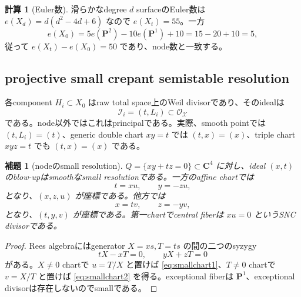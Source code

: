 \documentclass[11pt,a4paper]{ltjsarticle}
\newtheorem{lemma}[theorem]{補題}
\theoremstyle{definition}
\newtheorem{computation}[theorem]{計算}
\theoremstyle{remark}
\newcommand{\PP}{\mathbf P}
\newcommand{\CC}{\mathbf C}
\begin{document}
\begin{computation}[Euler数]
滑らかなdegree $d$ surfaceのEuler数は $e(X_d)=d(d^2-4d+6)$ なので $e(X_t)=55$。一方
\[
 e(X_0)=5e(\PP^2)-10e(\PP^1)+10=15-20+10=5,
\]
従って $e(X_t)-e(X_0)=50$ であり、node数と一致する。
\end{computation}

\subsection{projective small crepant semistable resolution}

各component $H_i\subset X_0$ はraw total space上のWeil divisorであり、そのidealは
\begin{equation}\label{eq:componentideal}
 \mathcal I_i=(t,L_i)\subset\mathcal O_{\mathcal X}
\end{equation}
である。node以外ではこれはprincipalである。実際、smooth pointでは $(t,L_i)=(t)$、generic double chart $xy=t$ では $(t,x)=(x)$、triple chart $xyz=t$ でも $(t,x)=(x)$ である。

\begin{lemma}[nodeのsmall resolution]\label{lem:local-small-resolution}
$Q=\{xy+tz=0\}\subset\CC^4$ に対し、ideal $(x,t)$ のblow-upはsmoothなsmall resolutionである。一方のaffine chartでは
\begin{equation}\label{eq:smallchart1}
 t=xu,\qquad y=-zu,
\end{equation}
となり、$(x,z,u)$ が座標である。他方では
\begin{equation}\label{eq:smallchart2}
 x=tv,\qquad z=-yv,
\end{equation}
となり、$(t,y,v)$ が座標である。第一chartでcentral fiberは $xu=0$ というSNC divisorである。
\end{lemma}

\begin{proof}
Rees algebraにはgenerator $X=xs,T=ts$ の間の二つのsyzygy
\[
 tX-xT=0,\qquad yX+zT=0
\]
がある。$X\ne0$ chartで $u=T/X$ と置けば \eqref{eq:smallchart1}、$T\ne0$ chartで $v=X/T$ と置けば \eqref{eq:smallchart2} を得る。exceptional fiberは $\PP^1$、exceptional divisorは存在しないのでsmallである。
\end{proof}
\end{document}
